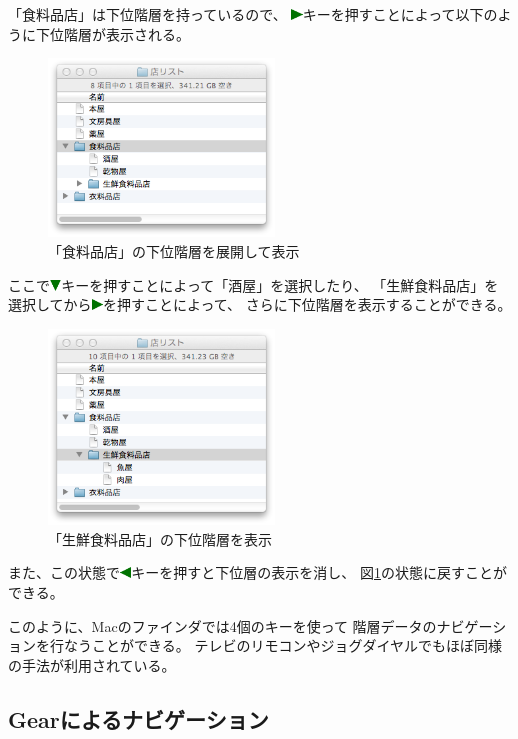 \documentclass[twoside]{wiss}
\def\GEAR{\textsf{Gear}}
\def\downtriangle{\includegraphics[width=3mm,bb=0 0 36 36]{figures/downtriangle.pdf}}
\def\righttriangle{\includegraphics[width=3mm,bb=0 0 36 36]{figures/righttriangle.pdf}}
\def\lefttriangle{\includegraphics[width=3mm,bb=0 0 36 36]{figures/lefttriangle.pdf}}
\begin{document}
\noindent
「食料品店」は下位階層を持っているので、
{\righttriangle}キーを押すことによって以下のように下位階層が表示される。

\begin{figure}[H]
\centerline{\includegraphics[width=60mm,bb=0 0 344 272]{figures/51d867d4721f65c18e84172c8818e137.png}}
\caption{「食料品店」の下位階層を展開して表示}
\label{screenshot5}
\end{figure}

\noindent
ここで{\downtriangle}キーを押すことによって「酒屋」を選択したり、
「生鮮食料品店」を選択してから{\righttriangle}を押すことによって、
さらに下位階層を表示することができる。

\begin{figure}[H]
\centerline{\includegraphics[width=60mm,bb=0 0 344 298]{figures/ce3ee682612de44d6c663a7323c262a6.png}}
\caption{「生鮮食料品店」の下位階層を表示}
\label{screenshot6}
\end{figure}

\noindent
また、この状態で{\lefttriangle}キーを押すと下位層の表示を消し、
図\ref{screenshot5}の状態に戻すことができる。

このように、Macのファインダでは4個のキーを使って
階層データのナビゲーションを行なうことができる。
テレビのリモコンやジョグダイヤルでもほぼ同様の手法が利用されている。

\subsection*{{\GEAR}によるナビゲーション}
\end{document}
